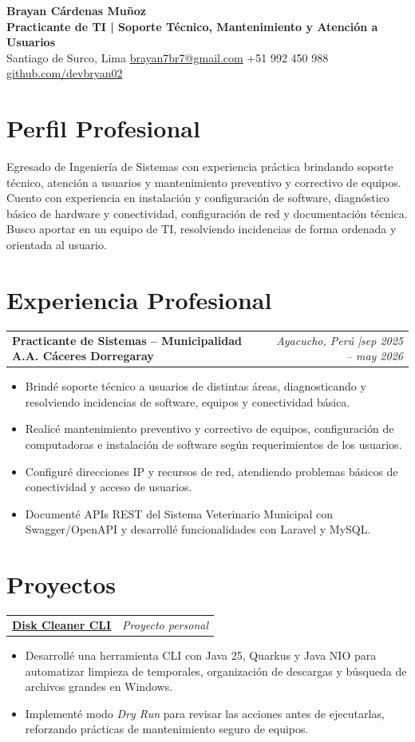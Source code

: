 \documentclass[10pt, letterpaper]{article}
\makeatletter
\newcommand{\cvproject}[3]{%
  \noindent
  \begin{tabularx}{\linewidth}{@{}Xr@{}}
    \textbf{#1} & \textit{\small #2}
  \end{tabularx}%
  \vspace{0pt}%
  \begin{itemize}[leftmargin=1.2em, itemsep=0pt, topsep=0pt, parsep=0pt, partopsep=0pt]
    #3
  \end{itemize}%
  \vspace{0pt}
}
\makeatother
\begin{document}
\begin{center}
  {\LARGE\bfseries\color{primary} Brayan Cárdenas Muñoz}\\[2pt]
  {\large\textbf{Practicante de TI | Soporte Técnico, Mantenimiento y Atención a Usuarios}}\\[2pt]
  {\small
    Santiago de Surco, Lima \quad\textbar\quad
    \href{mailto:brayan7br7@gmail.com}{brayan7br7@gmail.com} \quad\textbar\quad
    +51 992 450 988 \quad\textbar\quad
    \href{https://github.com/devbryan02}{github.com/devbryan02}
  }
\end{center}
\vspace{1pt}
\section{Perfil Profesional}
Egresado de Ingeniería de Sistemas con experiencia práctica brindando soporte técnico, atención a usuarios y mantenimiento preventivo y correctivo de equipos. Cuento con experiencia en instalación y configuración de software, diagnóstico básico de hardware y conectividad, configuración de red y documentación técnica. Busco aportar en un equipo de TI, resolviendo incidencias de forma ordenada y orientada al usuario.
\section{Experiencia Profesional}
\cvproject{%
  Practicante de Sistemas -- Municipalidad A.A. Cáceres Dorregaray%
}{Ayacucho, Perú \quad|\quad sep 2025 -- may 2026}{%
  \item Brindé soporte técnico a usuarios de distintas áreas, diagnosticando y resolviendo incidencias de software, equipos y conectividad básica.
  \item Realicé mantenimiento preventivo y correctivo de equipos, configuración de computadoras e instalación de software según requerimientos de los usuarios.
  \item Configuré direcciones IP y recursos de red, atendiendo problemas básicos de conectividad y acceso de usuarios.
  \item Documenté APIs REST del Sistema Veterinario Municipal con Swagger/OpenAPI y desarrollé funcionalidades con Laravel y MySQL.
}
\section{Proyectos}
\cvproject{%
  \href{https://github.com/devbryan02/disk-cleaner-quarkus-cli}{Disk Cleaner CLI}%
}{Proyecto personal}{%
  \item Desarrollé una herramienta CLI con Java 25, Quarkus y Java NIO para automatizar limpieza de temporales, organización de descargas y búsqueda de archivos grandes en Windows.
  \item Implementé modo \textit{Dry Run} para revisar las acciones antes de ejecutarlas, reforzando prácticas de mantenimiento seguro de equipos.
}
\end{document}
